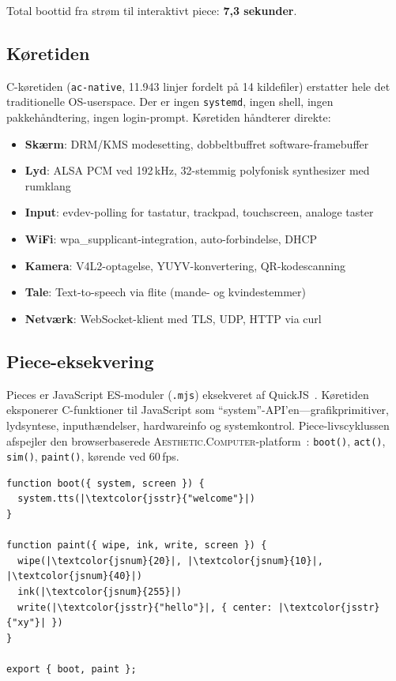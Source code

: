 \documentclass[10pt,letterpaper,twocolumn]{article}
\newcommand{\ac}{\textsc{Aesthetic.Computer}}
\begin{document}
Total boottid fra strøm til interaktivt piece: \textbf{7,3 sekunder}.

\subsection{Køretiden}

C-køretiden (\texttt{ac-native}, 11.943 linjer fordelt på 14 kildefiler) erstatter hele det traditionelle OS-userspace. Der er ingen \texttt{systemd}, ingen shell, ingen pakkehåndtering, ingen login-prompt. Køretiden håndterer direkte:

\begin{itemize}
  \item \textbf{Skærm}: DRM/KMS modesetting, dobbeltbuffret software-framebuffer
  \item \textbf{Lyd}: ALSA PCM ved 192\,kHz, 32-stemmig polyfonisk synthesizer med rumklang
  \item \textbf{Input}: evdev-polling for tastatur, trackpad, touchscreen, analoge taster
  \item \textbf{WiFi}: wpa\_supplicant-integration, auto-forbindelse, DHCP
  \item \textbf{Kamera}: V4L2-optagelse, YUYV-konvertering, QR-kodescanning
  \item \textbf{Tale}: Text-to-speech via flite (mande- og kvindestemmer)
  \item \textbf{Netværk}: WebSocket-klient med TLS, UDP, HTTP via curl
\end{itemize}

\subsection{Piece-eksekvering}

Pieces er JavaScript ES-moduler (\texttt{.mjs}) eksekveret af QuickJS~\citep{bellard2005quickjs}. Køretiden eksponerer C-funktioner til JavaScript som ``system''-API'en---grafikprimitiver, lydsyntese, inputhændelser, hardwareinfo og systemkontrol. Piece-livscyklussen afspejler den browserbaserede \ac{}-platform~\citep{scudder2026ac}: \texttt{boot()}, \texttt{act()}, \texttt{sim()}, \texttt{paint()}, kørende ved 60\,fps.

\begin{lstlisting}[style=acjsstyle]
function boot({ system, screen }) {
  system.tts(|\textcolor{jsstr}{"welcome"}|)
}

function paint({ wipe, ink, write, screen }) {
  wipe(|\textcolor{jsnum}{20}|, |\textcolor{jsnum}{10}|, |\textcolor{jsnum}{40}|)
  ink(|\textcolor{jsnum}{255}|)
  write(|\textcolor{jsstr}{"hello"}|, { center: |\textcolor{jsstr}{"xy"}| })
}

export { boot, paint };
\end{lstlisting}
\end{document}
